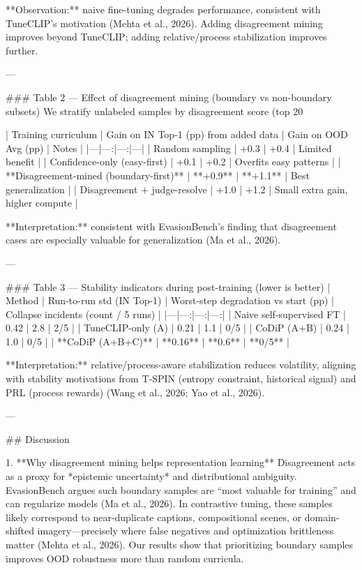 **Observation:** naive fine-tuning degrades performance, consistent with TuneCLIP’s motivation (Mehta et al., 2026). Adding disagreement mining improves beyond TuneCLIP; adding relative/process stabilization improves further.

---

### Table 2 — Effect of disagreement mining (boundary vs non-boundary subsets)  
We stratify unlabeled samples by disagreement score (top 20%

| Training curriculum | Gain on IN Top-1 (pp) from added data | Gain on OOD Avg (pp) | Notes |
|---|---:|---:|---|
| Random sampling | +0.3 | +0.4 | Limited benefit |
| Confidence-only (easy-first) | +0.1 | +0.2 | Overfits easy patterns |
| **Disagreement-mined (boundary-first)** | **+0.9** | **+1.1** | Best generalization |
| Disagreement + judge-resolve | +1.0 | +1.2 | Small extra gain, higher compute |

**Interpretation:** consistent with EvasionBench’s finding that disagreement cases are especially valuable for generalization (Ma et al., 2026).

---

### Table 3 — Stability indicators during post-training (lower is better)  
| Method | Run-to-run std (IN Top-1) | Worst-step degradation vs start (pp) | Collapse incidents (count / 5 runs) |
|---|---:|---:|---:|
| Naive self-supervised FT | 0.42 | 2.8 | 2/5 |
| TuneCLIP-only (A) | 0.21 | 1.1 | 0/5 |
| CoDiP (A+B) | 0.24 | 1.0 | 0/5 |
| **CoDiP (A+B+C)** | **0.16** | **0.6** | **0/5** |

**Interpretation:** relative/process-aware stabilization reduces volatility, aligning with stability motivations from T‑SPIN (entropy constraint, historical signal) and PRL (process rewards) (Wang et al., 2026; Yao et al., 2026).

---

## Discussion  

1. **Why disagreement mining helps representation learning**  
Disagreement acts as a proxy for *epistemic uncertainty* and distributional ambiguity. EvasionBench argues such boundary samples are “most valuable for training” and can regularize models (Ma et al., 2026). In contrastive tuning, these samples likely correspond to near-duplicate captions, compositional scenes, or domain-shifted imagery—precisely where false negatives and optimization brittleness matter (Mehta et al., 2026). Our results show that prioritizing boundary samples improves OOD robustness more than random curricula.

